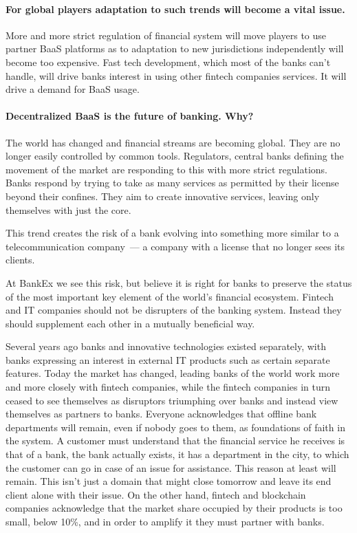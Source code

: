 \documentclass{article}
\begin{document}
\begin{multicols}{2}
\paragraph*{For global players adaptation to such trends will become a vital issue.} More and more strict regulation of financial system will move players to use partner BaaS platforms as to adaptation to new jurisdictions independently will become too expensive. Fast tech development,  which most of the banks can’t handle, will drive banks interest in using other fintech companies services. It will drive a demand for BaaS usage.

\paragraph*{Decentralized BaaS is the future of banking. Why?} The world has changed and financial streams are becoming global. They are no longer easily controlled by common tools. Regulators, central banks defining the movement of the market are responding to this with more strict regulations. Banks respond by trying to take as many services as permitted by their license beyond their confines. They aim to create innovative services, leaving only themselves with just the core.

This trend creates the risk of a bank evolving into something more similar to a telecommunication company~--- a company with a license that no longer sees its clients.

At BankEx we see this risk, but believe it is right for banks to preserve the status of the most important key element of the world’s financial ecosystem. Fintech and IT companies should not be disrupters of the banking system. Instead they should supplement each other in a mutually beneficial way.

Several years ago banks and innovative technologies existed separately, with banks expressing an interest in external IT products such as certain separate features. Today the market has changed, leading banks of the world work more and more closely with fintech companies, while the fintech companies in turn ceased to see themselves as disruptors triumphing over banks and instead view themselves as partners to banks. Everyone acknowledges that offline bank departments will remain, even if nobody goes to them, as foundations of faith in the system. A customer must understand that the financial service he receives is that of a bank, the bank actually exists, it has a department in the city, to which the customer can go in case of an issue for assistance. This reason at least will remain. This isn’t just a domain that might close tomorrow and leave its end client alone with their issue. On the other hand, fintech and blockchain companies acknowledge that the market share occupied by their products is too small, below 10\%, and in order to amplify it they must partner with banks.


\end{multicols}
\end{document}
